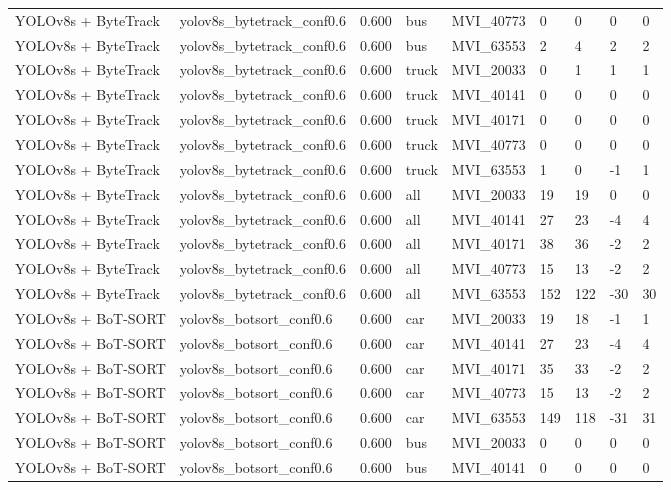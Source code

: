 \begin{tabular}{lllllllll}
YOLOv8s + ByteTrack & yolov8s\_bytetrack\_conf0.6 & 0.600 & bus & MVI\_40773 & 0 & 0 & 0 & 0 \\
YOLOv8s + ByteTrack & yolov8s\_bytetrack\_conf0.6 & 0.600 & bus & MVI\_63553 & 2 & 4 & 2 & 2 \\
YOLOv8s + ByteTrack & yolov8s\_bytetrack\_conf0.6 & 0.600 & truck & MVI\_20033 & 0 & 1 & 1 & 1 \\
YOLOv8s + ByteTrack & yolov8s\_bytetrack\_conf0.6 & 0.600 & truck & MVI\_40141 & 0 & 0 & 0 & 0 \\
YOLOv8s + ByteTrack & yolov8s\_bytetrack\_conf0.6 & 0.600 & truck & MVI\_40171 & 0 & 0 & 0 & 0 \\
YOLOv8s + ByteTrack & yolov8s\_bytetrack\_conf0.6 & 0.600 & truck & MVI\_40773 & 0 & 0 & 0 & 0 \\
YOLOv8s + ByteTrack & yolov8s\_bytetrack\_conf0.6 & 0.600 & truck & MVI\_63553 & 1 & 0 & -1 & 1 \\
YOLOv8s + ByteTrack & yolov8s\_bytetrack\_conf0.6 & 0.600 & all & MVI\_20033 & 19 & 19 & 0 & 0 \\
YOLOv8s + ByteTrack & yolov8s\_bytetrack\_conf0.6 & 0.600 & all & MVI\_40141 & 27 & 23 & -4 & 4 \\
YOLOv8s + ByteTrack & yolov8s\_bytetrack\_conf0.6 & 0.600 & all & MVI\_40171 & 38 & 36 & -2 & 2 \\
YOLOv8s + ByteTrack & yolov8s\_bytetrack\_conf0.6 & 0.600 & all & MVI\_40773 & 15 & 13 & -2 & 2 \\
YOLOv8s + ByteTrack & yolov8s\_bytetrack\_conf0.6 & 0.600 & all & MVI\_63553 & 152 & 122 & -30 & 30 \\
YOLOv8s + BoT-SORT & yolov8s\_botsort\_conf0.6 & 0.600 & car & MVI\_20033 & 19 & 18 & -1 & 1 \\
YOLOv8s + BoT-SORT & yolov8s\_botsort\_conf0.6 & 0.600 & car & MVI\_40141 & 27 & 23 & -4 & 4 \\
YOLOv8s + BoT-SORT & yolov8s\_botsort\_conf0.6 & 0.600 & car & MVI\_40171 & 35 & 33 & -2 & 2 \\
YOLOv8s + BoT-SORT & yolov8s\_botsort\_conf0.6 & 0.600 & car & MVI\_40773 & 15 & 13 & -2 & 2 \\
YOLOv8s + BoT-SORT & yolov8s\_botsort\_conf0.6 & 0.600 & car & MVI\_63553 & 149 & 118 & -31 & 31 \\
YOLOv8s + BoT-SORT & yolov8s\_botsort\_conf0.6 & 0.600 & bus & MVI\_20033 & 0 & 0 & 0 & 0 \\
YOLOv8s + BoT-SORT & yolov8s\_botsort\_conf0.6 & 0.600 & bus & MVI\_40141 & 0 & 0 & 0 & 0 \\

\end{tabular}
